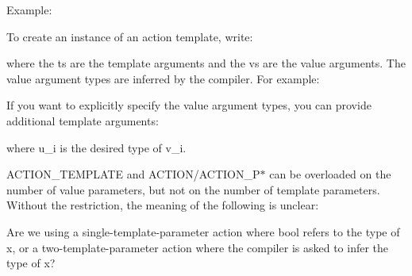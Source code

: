 Example\+: 
\begin{DoxyCode}{0}
\DoxyCodeLine{\}}
\end{DoxyCode}


To create an instance of an action template, write\+: 
\begin{DoxyCode}{0}
\end{DoxyCode}
 where the {\ttfamily t}s are the template arguments and the {\ttfamily v}s are the value arguments. The value argument types are inferred by the compiler. For example\+: 
\begin{DoxyCode}{0}
\end{DoxyCode}


If you want to explicitly specify the value argument types, you can provide additional template arguments\+: 
\begin{DoxyCode}{0}
\end{DoxyCode}
 where {\ttfamily u\+\_\+i} is the desired type of {\ttfamily v\+\_\+i}.

{\ttfamily A\+C\+T\+I\+O\+N\+\_\+\+T\+E\+M\+P\+L\+A\+TE} and {\ttfamily A\+C\+T\+I\+ON}/{\ttfamily A\+C\+T\+I\+O\+N\+\_\+\+P$\ast$} can be overloaded on the number of value parameters, but not on the number of template parameters. Without the restriction, the meaning of the following is unclear\+:


\begin{DoxyCode}{0}
\end{DoxyCode}


Are we using a single-\/template-\/parameter action where {\ttfamily bool} refers to the type of {\ttfamily x}, or a two-\/template-\/parameter action where the compiler is asked to infer the type of {\ttfamily x}?

